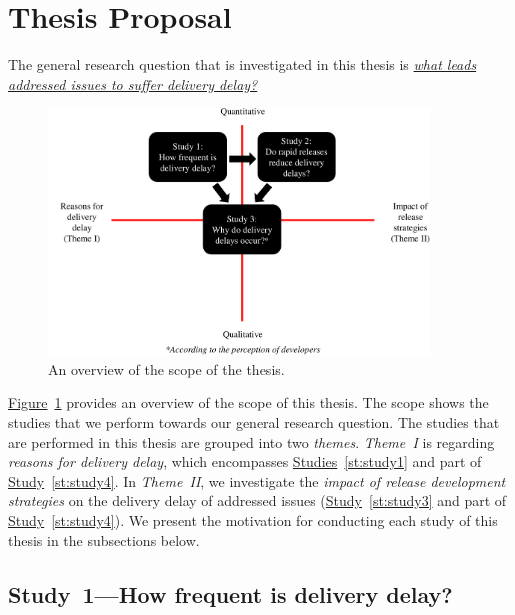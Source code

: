 \section{Thesis Proposal} \label{sec:thesis_overview}

\begin{sloppypar}
The general research question that is investigated in this thesis is {\em
\underline{what leads addressed issues to suffer delivery delay?}}
\end{sloppypar}

\begin{figure}[t]
	\centering
	\includegraphics[width=0.90\textwidth,keepaspectratio]
	{chapters/chapter1/figures/thesis_overview.pdf}
	\caption{An overview of the scope of the thesis.}
	\label{fig:thesis_overview}
\end{figure}

\hyperref[fig:thesis_overview]{Figure}~\ref{fig:thesis_overview} provides an
overview of the scope of this thesis. The scope shows the studies that we
perform towards our general research question. The studies that are performed in
this thesis are grouped into two {\em themes}. {\em
Theme~I} is regarding {\em reasons for delivery delay},
which encompasses \hyperref[st:study1]{Studies}~\ref{st:study1} and part of
\hyperref[st:study4]{Study}~\ref{st:study4}. In {\em
Theme~II}, we investigate the {\em impact of release
development strategies} on the delivery delay of addressed issues
(\hyperref[st:study3]{Study}~\ref{st:study3} and part of
\hyperref[st:study4]{Study}~\ref{st:study4}). We present the motivation for
conducting each study of this thesis in the subsections below.

\subsection{Study~1---How frequent is delivery delay?}

